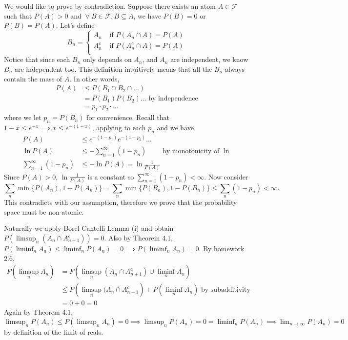 \documentclass[12pt]{article}
\begin{document}
\begin{problem}[2]
	We would like to prove by contradiction. Suppose there exists an atom $ A \in \mathcal{F}$ such that $ P(A)>0$ and  $ \ \forall \ B \in \mathcal{F}, B \subseteq A$, we have $ P(B)=0$ or $ P(B)=P(A)$. Let's define
	 \begin{equation*}
	B_n =
	\begin{cases}
		A_n & \text{ if } P(A_n \cap A) = P(A)\\ 	
		A_n^{c} & \text{ if } P(A_n^{c} \cap A) = P(A)\\
	\end{cases}
	\end{equation*}
	Notice that since each $B_n $ only depends on $ A_n$, and $ A_n$ are independent, we know $ B_n$ are independent too. This definition intuitively means that all the $ B_n$ always contain the mass of $ A$. In other words, 
	 \begin{align*}
		 P(A) &\leq P(B_1 \cap B_2 \cap \ldots )\\
		      &= P(B_1)P(B_2)\ldots \text{ by independence} \\
		      &= p_1 \cdot  p_2 \cdot  \ldots 
	\end{align*}
	where we let $p_n = P(B_n)$ for convenience. Recall that $ 1-x \leq e^{-x} \implies x \leq e^{-(1-x)}$, applying to each $ p_n$ and we have
	\begin{align*}
		P(A) &\leq e^{-(1-p_1)} e^{-(1-p_2)} \ldots \\
		\ln P(A) &\leq - \sum_{ n= 1}^{\infty} (1-p_n) \qquad \text{ by monotonicity of }\ln \\ 
		\sum_{ n= 1}^{\infty} (1-p_n) &\leq -\ln P(A) = \ln \frac{1}{P(A)}
	\end{align*}
	Since $ P(A) > 0$,  $ \ln \frac{1}{P(A)}$ is a constant so $ \sum_{ n= 1}^{\infty} (1-p_n) < \infty$.
	Now consider
	\[
		\sum_n \min \{P(A_n), 1-P(A_n)\} = \sum_n \min \{P(B_n), 1-P(B_n)\} \leq \sum_n (1-p_n) < \infty 
	.\] 
	This contradicts with our assumption, therefore we prove that the probability space must be non-atomic.
\end{problem}
\begin{problem}[3]
	Naturally we apply Borel-Cantelli Lemma (i) and obtain $ P\left( \limsup_{  n} (A_n \cap A_{n+1}^{c}) \right) =0$. Also by Theorem 4.1, $ P\left( \liminf_{  n} A_n \right) \leq \liminf_{  n} P(A_n) = 0 \implies P\left( \liminf_{  n} A_n \right) =0$. By homework 2.6,
\begin{align*}
	P\left( \limsup_{  n} A_n \right) &= P\left( \limsup_{  n} (A_n \cap A_{n+1}^{c}) \cup \liminf_{  n} A_n \right)  \\
					  &\leq P\left( \limsup_{  n} (A_n \cap A_{n+1}^{c} \right) + P\left( \liminf_{  n} A_n \right) \text{ by subadditivity}    \\
					  &= 0 + 0 = 0
\end{align*}
Again by Theorem 4.1, $ \limsup_{n} P(A_n) \leq P\left( \limsup_{  n} A_n \right)  =0 \implies \limsup_{  n} P(A_n) = 0 = \liminf_{  n} P(A_n) \implies \lim_{ n \to \infty} P(A_n) = 0$ by definition of the limit of reals.
\end{problem}
\end{document}
